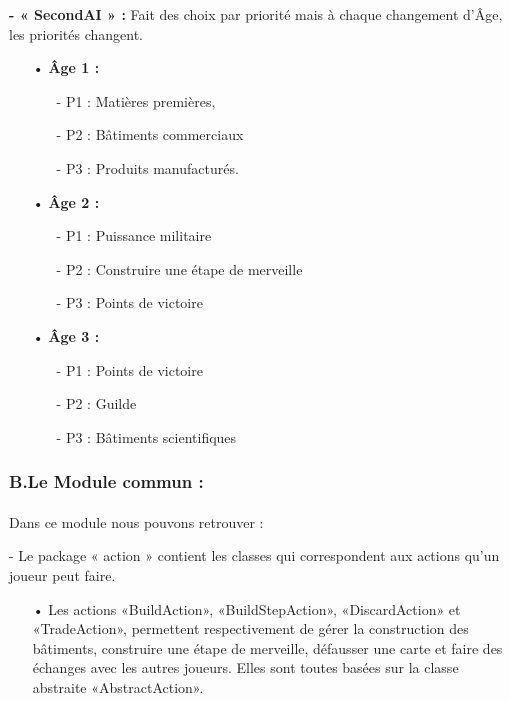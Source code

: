 \documentclass[13pt ,a4paper ]{report}
\begin{document}
\begin{multicols}{2}
\begin{flushleft}
\textbf{- « SecondAI » :} Fait des choix par priorité mais à chaque changement d’Âge, les priorités changent.
\begin{itemize}
\item[•] \textbf{Âge 1 :} 
    \begin{itemize}
     \item[-]P1 : Matières premières,
     \item[-]P2 : Bâtiments commerciaux
     \item[-]P3 : Produits manufacturés.
    \end{itemize}
\item[•] \textbf{Âge 2 :} 
   \begin{itemize}
     \item[-]P1 : Puissance militaire
	 \item[-]P2 : Construire une étape de merveille
	 \item[-]P3 : Points de victoire
\end{itemize}
\item[•] \textbf{Âge 3 : }
    \begin{itemize}
     \item[-]P1 : Points de victoire
     \item[-]P2 : Guilde
     \item[-]P3 : Bâtiments scientifiques
    \end{itemize}	
\end{itemize}

 \end{flushleft} 
    \subsubsection{B.\hspace*{0.5cm}Le Module commun :}
 	\paragraph{}

Dans ce module nous pouvons retrouver : 
\begin{flushleft}
- Le package « action » contient les classes qui correspondent aux actions qu’un joueur peut faire. 
\begin{itemize}
\item[•]
Les actions «BuildAction», «BuildStepAction», «DiscardAction» et «TradeAction», permettent respectivement de gérer la construction des bâtiments, construire une étape de merveille, défausser une carte et faire des échanges avec les autres joueurs. Elles sont toutes basées sur la classe abstraite «AbstractAction». \newline
\end{itemize}


\end{flushleft}
\end{multicols}
\end{document}
